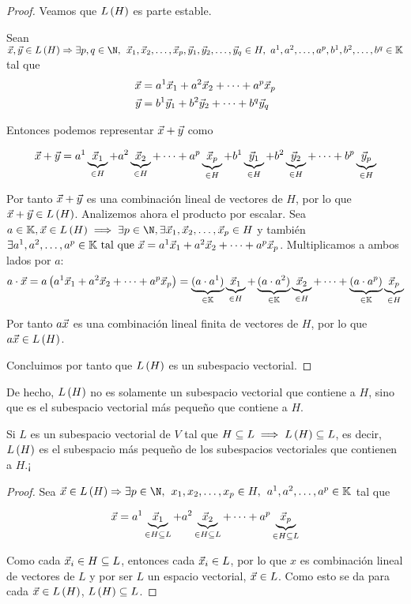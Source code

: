 \documentclass[../ecuaciones_diferenciales.tex]{subfiles}
\begin{document}
\begin{proof}
    Veamos que $L\left(H\right)$ es parte estable.

    Sean $\vx, \vy \in \lspan{H} \Rightarrow \exists p, q \in \N, \spc \dlst{\vx}{p}, \dlst{\vy}{q} \in H, \, \, \ulst{a}{p}, \ulst{b}{q} \in \K $
    tal que 
    \begin{align*}
        \vec{x} &= {a}^{1}\vec{x}_{1}+{a}^{2}\vec{x}_{2}+\dots+{a}^{p}\vec{x}_{p} \\
        \vec{y} &= {b}^{1}\vec{y}_{1}+{b}^{2}\vec{y}_{2}+\dots+{b}^{q}\vec{y}_{q}
    \end{align*}

    Entonces podemos representar $\vec{x} + \vec{y}$ como
    
    \[
        \vec{x} + \vec{y} = a^1\underbrace{\vec{x}_1}_{\in H}+a^2\underbrace{\vec{x}_2}_{\in H}+\dots+a^p\underbrace{\vec{x}_p}_{\in H} + b^1\underbrace{\vec{y}_1}_{\in H}+b^2\underbrace{\vec{y}_2}_{\in H}+\dots+b^p\underbrace{\vec{y}_p}_{\in H}
    \]

    Por tanto $\vec{x} + \vec{y}$ es una combinación lineal de vectores de $H$, por lo que $\vec{x} + \vec{y} \in L\left(H\right)$. Analizemos ahora el producto por escalar. Sea $a \in \K, \vx \in \lspan{H} \implies \exists p \in \N, \space \exists \dlst{\vx}{p} \in H$ y también $\exists {a}^{1}, {a}^{2}, \dots, {a}^{p} \in \mathbb{K} \mathrm{\,\, tal \,\, que \,\,} \vec{x} = {a}^{1}\vec{x}_{1}+{a}^{2}\vec{x}_{2}+\dots+{a}^{p}\vec{x}_{p}$.  Multiplicamos a ambos lados por $a$:
    \[a\cdot \vec{x} = a \left( {a}^{1}\vec{x}_{1}+{a}^{2}\vec{x}_{2}+\dots+{a}^{p}\vec{x}_{p} \right) = \underbrace{(a \cdot a^1)}_{\in \mathbb{K}}\underbrace{\vec{x}_1}_{\in H} + \underbrace{(a \cdot a^2)}_{\in \mathbb{K}}\underbrace{\vec{x}_2}_{\in H} + \dots + \underbrace{(a \cdot a^p)}_{\in \mathbb{K}}\underbrace{\vec{x}_p}_{\in H}\]

    Por tanto $a\vec{x}$ es una combinación lineal finita de vectores de $H$, por lo que $a\vec{x} \in L\left(H\right)$.

    Concluimos por tanto que $L\left(H\right)$ es un subespacio vectorial.
\end{proof}

De hecho, $L\left(H\right)$ no es solamente un subespacio vectorial que contiene a $H$, sino que es el subespacio vectorial más pequeño que contiene a $H$. 

\begin{proposition}
    Si $L$ es un subespacio vectorial de $V$ tal que $H \subseteq L \implies L\left(H\right) \subseteq L$, es decir, $L\left(H\right)$ es el subespacio más pequeño de los subespacios vectoriales que contienen a $H$.¡
\end{proposition}

\begin{proof}
Sea $\vx \in \lspan{H} \Rightarrow \exists p \in \N, \spc \dlst{x}{p} \in H, \spc \ulst{a}{p} \in \K$ tal que 

\[ \vec{x} = a^1 \underbrace{\vec{x}_1}_{\in H \subseteq L} +  a^2\underbrace{\vec{x}_2}_{\in H \subseteq L} + \dots +  a^p \underbrace{\vec{x}_p}_{\in H \subseteq L} \]

Como cada $\vec{x}_i \in H \subseteq L$, entonces cada $\vec{x}_i \in L$, por lo que $x$ es combinación lineal de vectores de $L$ y por ser $L$ un espacio vectorial, $\vec{x} \in L$. Como esto se da para cada $\vec{x} \in L\left(H\right)$, $L\left(H\right) \subseteq L$.
\end{proof}
\end{document}
